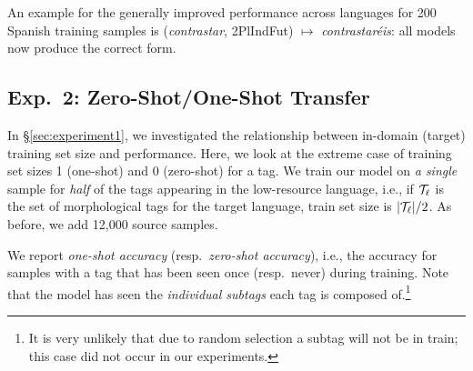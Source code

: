 \documentclass[11pt,letterpaper]{article}
\newcommand{\word}[1]{{\em #1}}
\newcommand{\mtag}[1]{{\small{\textsf{#1}}}}
\def\secref#1{\S\ref{sec:#1}}
\begin{document}
An example for the generally improved performance across languages
for 200 Spanish training samples is
(\word{contrastar}, \mtag{2PlIndFut}) $\mapsto$
\word{contrastar\'{e}is}: all models now produce the correct form.


\subsection{Exp.\ 2: Zero-Shot/One-Shot Transfer}
In \secref{experiment1}, we investigated the relationship
between in-domain (target) training set size and performance.
Here, we look at the extreme case of training set
sizes 1 (one-shot) and 0 (zero-shot) for a  tag.
We train our model on \textit{a single} sample for
\textit{half} of the tags appearing in the low-resource language, i.e., if
${\cal T_\ell}$ is the set of morphological tags for the target language, 
train set size is $|{\cal T_\ell}|/2$.
As before, we add 12,000 source samples.

We report 
\textit{one-shot accuracy}
(resp.\ \emph{zero-shot accuracy}), i.e.,
the accuracy for samples with a tag that has been
seen once (resp.\ never) during training.
Note that the model has seen the
\emph{individual subtags} each tag is composed
of.\footnote{It is very unlikely that due to random selection 
a subtag will not be in train; this case did not
occur in our experiments.}

\def\onezeroshotsep{-0.1cm}

\def\partparadigmsep{0.15cm}
\end{document}
